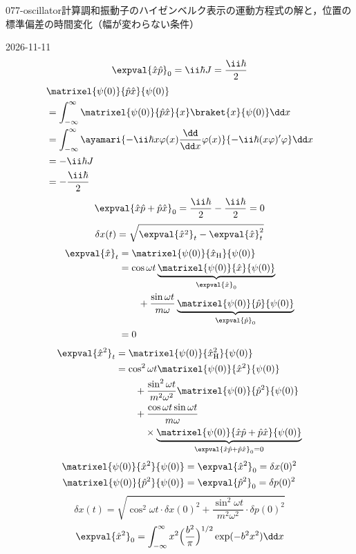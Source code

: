 \documentclass[uplatex,dvipdfmx,a4paper,11pt]{jsarticle}
\begin{document}
\begin{mondai}{077-oscillator}{計算}{調和振動子のハイゼンベルク表示の運動方程式の解と，位置の標準偏差の時間変化（幅が変わらない条件）}
\begin{kotaeutsushi}{2026-11-11}
\[ \expval{\hat{x}\hat{p}}_{0}=\ii\hbar J=\frac{\ii\hbar}{2} \]
\begin{align*}
&\matrixel{\psi(0)}{\hat{p}\hat{x}}{\psi(0)}\\
&=\int_{-\infty}^{\infty}\matrixel{\psi(0)}{\hat{p}\hat{x}}{x}\braket{x}{\psi(0)}\dd x\\
&=\int_{-\infty}^{\infty}\ayamari{-\ii\hbar x\varphi(x)\frac{\dd}{\dd x}\varphi(x)}{-\ii\hbar(x\varphi)'\varphi}\dd x\\
&=-\ii\hbar J\\
&=-\frac{\ii\hbar}{2}
\end{align*}
\[ \expval{\hat{x}\hat{p}+\hat{p}\hat{x}}_{0}=\frac{\ii\hbar}{2}-\frac{\ii\hbar}{2}=0 \]
\[ \delta x(t)=\sqrt{\expval{\hat{x}^{2}}_{t}-\expval{\hat{x}}_{t}^{2}} \]
\begin{align*}
\expval{\hat{x}}_{t}&=\matrixel{\psi(0)}{\hat{x}_{\mathrm{H}}}{\psi(0)}\\
&=\cos\omega t\underbrace{\matrixel{\psi(0)}{\hat{x}}{\psi(0)}}_{\expval{\hat{x}}_{0}}\\
&\qquad+\frac{\sin\omega t}{m\omega}\underbrace{\matrixel{\psi(0)}{\hat{p}}{\psi(0)}}_{\expval{\hat{p}}_{0}}\\
&=0
\end{align*}
\begin{align*}
\expval{\hat{x}^{2}}_{t}&=\matrixel{\psi(0)}{\hat{x}_{\mathrm{H}}^{2}}{\psi(0)}\\
&=\cos^{2}\omega t\matrixel{\psi(0)}{\hat{x}^{2}}{\psi(0)}\\
&\qquad+\frac{\sin^{2}\omega t}{m^{2}\omega^{2}}\matrixel{\psi(0)}{\hat{p}^{2}}{\psi(0)}\\
&\qquad+\frac{\cos\omega t\sin\omega t}{m\omega}\\
&\qquad\quad\times\underbrace{\matrixel{\psi(0)}{\hat{x}\hat{p}+\hat{p}\hat{x}}{\psi(0)}}_{\expval{\hat{x}\hat{p}+\hat{p}\hat{x}}_{0}=0}
\end{align*}
\begin{align*}
\matrixel{\psi(0)}{\hat{x}^{2}}{\psi(0)}&=\expval{\hat{x}^{2}}_{0}=\delta x(0)^{2}\\
\matrixel{\psi(0)}{\hat{p}^{2}}{\psi(0)}&=\expval{\hat{p}^{2}}_{0}=\delta p(0)^{2}
\end{align*}
\[ \delta x(t)=\sqrt{\cos^{2}\omega t\cdot\delta x(0)^{2}+\frac{\sin^{2}\omega t}{m^{2}\omega^{2}}\cdot\delta p(0)^{2}} \]
\begin{align*}
\expval{\hat{x}^{2}}_{0}&=\int_{-\infty}^{\infty}x^{2}\Bigl(\frac{b^{2}}{\pi}\Bigr)^{1/2}\exp(-b^{2}x^{2})\dd x\\

\end{align*}
\end{kotaeutsushi}
\end{mondai}
\end{document}
